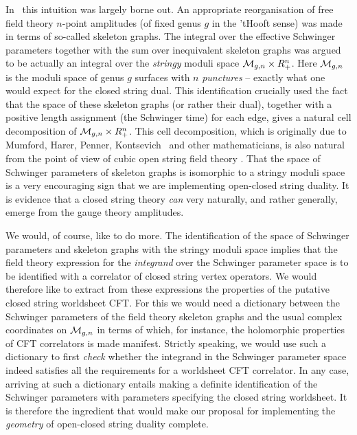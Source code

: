 In \ffb\ this intuition was largely borne out. An 
appropriate reorganisation of free field theory $n$-point amplitudes
(of fixed genus $g$ in the 'tHooft sense)  
was made in terms of 
so-called skeleton graphs. The integral over the 
effective Schwinger parameters
together with the sum over inequivalent skeleton graphs was argued to
be actually an integral over the {\it stringy} moduli space
${\cal M}_{g,n}\times R_{+}^n$. Here ${\cal M}_{g,n}$ is the moduli 
space of genus $g$ surfaces with $n$ {\it punctures} -- exactly what one
would expect for the closed string dual. 
This identification crucially used the fact that the space of 
these skeleton graphs (or rather their dual), together with a positive
length assignment (the Schwinger time) for each edge, gives a   
natural cell decomposition of ${\cal M}_{g,n}\times R_{+}^n$. This cell
decomposition, which 
is originally due to Mumford, Harer, Penner,
Kontsevich \harer\pen\kont\ and other mathematicians,
is also natural from the point of view of
cubic open string field theory \gmw\zwie . That the
space of Schwinger parameters of skeleton graphs is isomorphic to a 
stringy moduli space is a very encouraging sign 
that we are implementing open-closed string duality. It is 
evidence that a closed string theory {\it can} very naturally, and rather 
generally, emerge from the gauge theory amplitudes. 

We would, of course, like to do more. The identification of the 
space of  Schwinger parameters and skeleton graphs with the stringy 
moduli space implies that the field theory expression for 
the {\it integrand} over the Schwinger parameter space is to be identified 
with a correlator of closed string vertex operators. We would 
therefore like to 
extract from these expressions the properties of
the putative closed string worldsheet CFT. For this we would need 
a dictionary between the Schwinger parameters of the 
field theory skeleton graphs and the usual complex coordinates
on ${\cal M}_{g,n}$ in terms of which, for instance, the holomorphic 
properties of CFT correlators is made manifest. Strictly speaking, 
we would use
such a dictionary to first {\it check} whether the integrand in the Schwinger 
parameter space indeed satisfies all the requirements
for a worldsheet CFT correlator. In any case, arriving at 
such a dictionary entails making 
a definite identification of the Schwinger parameters with parameters 
specifying the closed string worldsheet. It is therefore the ingredient 
that would  
make our proposal 
for implementing the {\it geometry} of open-closed string duality complete.   

